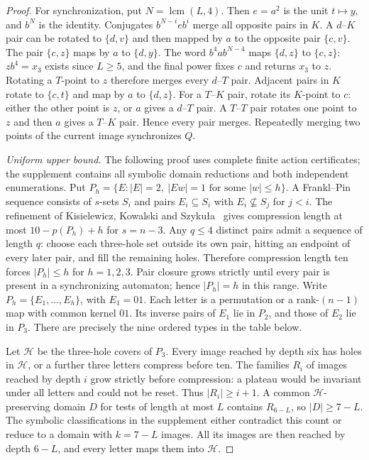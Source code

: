 \documentclass[10pt]{article}
\begin{document}
\begin{proof}
For synchronization, put $N=\operatorname{lcm}(L,4)$.
Then $e=a^2$ is the unit $t\mapsto y$, and $b^N$ is the identity.
Conjugates $b^{N-i}eb^i$ merge all opposite pairs in $K$.
A $d$--$K$ pair can be rotated to $\{d,v\}$ and then mapped by $a$ to the opposite pair $\{c,v\}$.
The pair $\{c,z\}$ maps by $a$ to $\{d,y\}$.
The word $b^4ab^{N-4}$ maps $\{d,z\}$ to $\{c,z\}$:
$zb^4=x_3$ exists since $L\ge5$, and the final power fixes $c$ and returns $x_3$ to $z$.
Rotating a $T$-point to $z$ therefore merges every $d$--$T$ pair.
Adjacent pairs in $K$ rotate to $\{c,t\}$ and map by $a$ to $\{d,z\}$.
For a $T$--$K$ pair, rotate its $K$-point to $c$: either the other point is $z$, or $a$ gives a $d$--$T$ pair.
A $T$--$T$ pair rotates one point to $z$ and then $a$ gives a $T$--$K$ pair.
Hence every pair merges. Repeatedly merging two points of the current image synchronizes $Q$.

\emph{Uniform upper bound.}
The following proof uses complete finite action certificates; the supplement
contains all symbolic domain reductions and both independent enumerations.
Put $P_h=\{E:|E|=2,\ |Ew|=1\text{ for some }|w|\le h\}$.
A Frankl--Pin sequence consists of $s$-sets $S_i$ and pairs
$E_i\subseteq S_i$ with $E_i\nsubseteq S_j$ for $j<i$.
The refinement of Kisielewicz, Kowalski and Szyku\l a~\cite[Theorem~1]{kisielewicz2016}
gives compression length at most $10-p(P_h)+h$ for $s=n-3$.
Any $q\le4$ distinct pairs admit a sequence of length $q$:
choose each three-hole set outside its own pair, hitting an endpoint
of every later pair, and fill the remaining holes.
Therefore compression length ten forces $|P_h|\le h$ for $h=1,2,3$.
Pair closure grows strictly until every pair is present in a synchronizing
automaton; hence $|P_h|=h$ in this range.
Write $P_h=\{E_1,\ldots,E_h\}$, with $E_1=01$.
Each letter is a permutation or a rank-$(n-1)$ map with common kernel $01$.
Its inverse pairs of $E_1$ lie in $P_2$, and those of $E_2$ lie in $P_3$.
There are precisely the nine ordered types in the table below.

Let $\mathcal H$ be the three-hole covers of $P_3$.
Every image reached by depth six has holes in $\mathcal H$, or a further
three letters compress before ten. The families $R_i$ of images reached
by depth $i$ grow strictly before compression: a plateau would be
invariant under all letters and could not be reset. Thus $|R_i|\ge i+1$.
A common $\mathcal H$-preserving domain $D$ for tests of length at most
$L$ contains $R_{6-L}$, so $|D|\ge7-L$.
The symbolic classifications in the supplement either contradict this
count or reduce to a domain with $k=7-L$ images.
All its images are then reached by depth $6-L$, and every letter maps
them into $\mathcal H$.


\end{proof}
\end{document}
